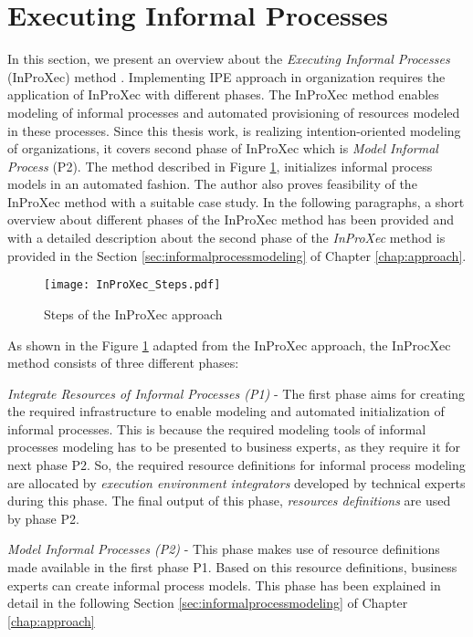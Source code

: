 \section{Executing Informal Processes}
\label{sec:inproxec}
In this section, we present an overview about the \textit{Executing Informal Processes} (InProXec) method \cite{Sungur2015}. Implementing IPE approach in organization requires the application of InProXec with different phases. The InProXec method enables modeling of informal processes and automated provisioning of resources modeled in these processes. Since this thesis work, is realizing intention-oriented modeling of organizations, it covers second phase of InProXec which is \textit{Model Informal Process} (P2). The method described in Figure \ref{fig:inprocxec_steps}, initializes informal process models in an automated fashion. The author also proves feasibility of the InProXec method with a suitable case study. In the following paragraphs, a short overview about different phases of the InProXec method has been provided and with a detailed description about the second phase of the \textit{InProXec} method is provided in the Section \ref{sec:informalprocessmodeling} of Chapter \ref{chap:approach}. 

\begin{figure}
	\centering
	\texttt{[image: InProXec\_Steps.pdf]}
	\caption{Steps of the InProXec approach}
	\label{fig:inprocxec_steps}
\end{figure} 

As shown in the Figure \ref{fig:inprocxec_steps} adapted from the InProXec approach, the InProcXec method consists of three different phases:

\textit{Integrate Resources of Informal Processes (P1)} - The first phase aims for creating the required infrastructure to enable modeling and automated initialization of informal processes. This is because the required modeling tools of informal processes modeling has to be presented to  business experts, as they require it for next phase P2. So, the required resource definitions for informal process modeling are allocated by \textit{execution environment integrators} developed by technical experts during this phase. The final output of this phase, \textit{resources definitions} are used by phase P2. 

\textit{Model Informal Processes (P2)} - This phase makes use of resource definitions made available in the first phase P1.  Based on this resource definitions, business experts can create informal process models. This phase has been explained in detail in the following Section \ref{sec:informalprocessmodeling} of Chapter \ref{chap:approach}

